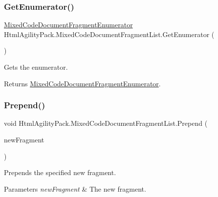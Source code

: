 \subsubsection{\texorpdfstring{Get\+Enumerator()}{GetEnumerator()}}
{\footnotesize\ttfamily \hyperlink{class_html_agility_pack_1_1_mixed_code_document_fragment_list_1_1_mixed_code_document_fragment_enumerator}{Mixed\+Code\+Document\+Fragment\+Enumerator} Html\+Agility\+Pack.\+Mixed\+Code\+Document\+Fragment\+List.\+Get\+Enumerator (\begin{DoxyParamCaption}{ }\end{DoxyParamCaption})\hspace{0.3cm}{\ttfamily [inline]}}



Gets the enumerator. 

\begin{DoxyReturn}{Returns}
\hyperlink{class_html_agility_pack_1_1_mixed_code_document_fragment_list_1_1_mixed_code_document_fragment_enumerator}{Mixed\+Code\+Document\+Fragment\+Enumerator}.
\end{DoxyReturn}
\mbox{\label{class_html_agility_pack_1_1_mixed_code_document_fragment_list_a4d0e1fa45e09f8b4668c63f35461ea94}} 
\subsubsection{\texorpdfstring{Prepend()}{Prepend()}}
{\footnotesize\ttfamily void Html\+Agility\+Pack.\+Mixed\+Code\+Document\+Fragment\+List.\+Prepend (\begin{DoxyParamCaption}\item[{\hyperlink{class_html_agility_pack_1_1_mixed_code_document_fragment}{Mixed\+Code\+Document\+Fragment}}]{new\+Fragment }\end{DoxyParamCaption})\hspace{0.3cm}{\ttfamily [inline]}}



Prepends the specified new fragment. 


\begin{DoxyParams}{Parameters}
{\em new\+Fragment} & The new fragment.\\
\hline
\end{DoxyParams}

